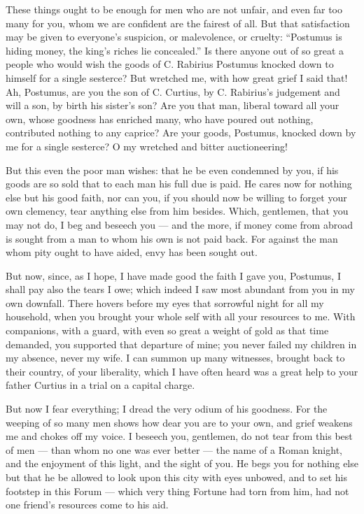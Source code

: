  These things ought to be enough for men who are not unfair, and even far too many for you, whom we are confident are the fairest of all. But that satisfaction may be given to everyone's suspicion, or malevolence, or cruelty: ``Postumus is hiding money, the king's riches lie concealed.'' Is there anyone out of so great a people who would wish the goods of C. Rabirius Postumus knocked down to himself for a single sesterce? But wretched me, with how great grief I said that! Ah, Postumus, are you the son of C. Curtius, by C. Rabirius's judgement and will a son, by birth his sister's son? Are you that man, liberal toward all your own, whose goodness has enriched many, who have poured out nothing, contributed nothing to any caprice? Are your goods, Postumus, knocked down by me for a single sesterce? O my wretched and bitter auctioneering!

 But this even the poor man wishes: that he be even condemned by you, if his goods are so sold that to each man his full due is paid. He cares now for nothing else but his good faith, nor can you, if you should now be willing to forget your own clemency, tear anything else from him besides. Which, gentlemen, that you may not do, I beg and beseech you --- and the more, if money come from abroad is sought from a man to whom his own is not paid back. For against the man whom pity ought to have aided, envy has been sought out.

 But now, since, as I hope, I have made good the faith I gave you, Postumus, I shall pay also the tears I owe; which indeed I saw most abundant from you in my own downfall. There hovers before my eyes that sorrowful night for all my household, when you brought your whole self with all your resources to me. With companions, with a guard, with even so great a weight of gold as that time demanded, you supported that departure of mine; you never failed my children in my absence, never my wife. I can summon up many witnesses, brought back to their country, of your liberality, which I have often heard was a great help to your father Curtius in a trial on a capital charge.

 But now I fear everything; I dread the very odium of his goodness. For the weeping of so many men shows how dear you are to your own, and grief weakens me and chokes off my voice. I beseech you, gentlemen, do not tear from this best of men --- than whom no one was ever better --- the name of a Roman knight, and the enjoyment of this light, and the sight of you. He begs you for nothing else but that he be allowed to look upon this city with eyes unbowed, and to set his footstep in this Forum --- which very thing Fortune had torn from him, had not one friend's resources come to his aid.
